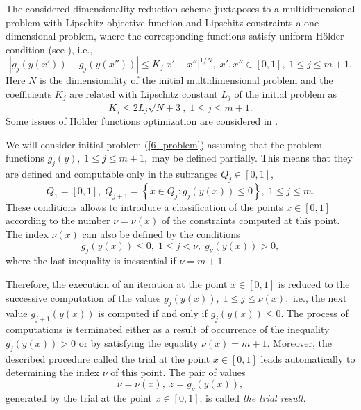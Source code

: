 The considered dimensionality reduction scheme juxtaposes to a multidimensional problem with Lipschitz objective function and Lipschitz constraints a one-dimensional problem, where the corresponding functions satisfy uniform H\"{o}lder condition (see \cite{6_Strongin2000,6_Strongin2013}), i.e.,
\begin{equation}\label{6_Holder}
\left|g_j(y(x'))-g_j(y(x''))\right| \leq K_j \left|x'-x''\right|^{1/N}, \; x',x''\in [0,1], \; 1\leq j \leq m+1. 
\end{equation}
Here $N$ is the dimensionality of the initial multidimensional problem and the coefficients $K_j$ are related with Lipschitz constant $L_j$ of the initial problem as 
\[
K_j \leq 2L_j \sqrt{N+3},\; 1\leq j \leq m+1.
\]
Some issues of H\"older functions optimization are considered in \cite{6_Gourdin,6_Lera2002,6_Lera2010,6_Hime,6_Lera2015}.

We will consider initial problem (\ref{6_problem}) assuming that the problem functions $g_j(y),\; 1 \leq j \leq m+1,$ may be defined partially. This means that they are defined and computable only in the subranges $Q_j \in [0,1]$, 
\begin{equation}\label{6_Q}
Q_1=[0,1], \; Q_{j+1}=\left\{x \in Q_j : g_j(y(x)) \leq 0 \right\}, \; 1 \leq j \leq m.
\end{equation}
These conditions allows to introduce a classification of the points $x \in [0,1]$ according to the number $\nu = \nu(x)$ of the constraints computed at this point. The index $\nu(x)$ can also be defined by the conditions
\begin{equation}\label{6_nu}
g_j(y(x)) \leq 0, \; 1 \leq j < \nu, \; g_\nu(y(x))>0,
\end{equation}
where the last inequality is inessential if $\nu=m+1$.

Therefore, the execution of an iteration at the point $x \in [0,1]$ is reduced to the successive computation of the values $g_j(y(x)),\; 1 \leq j \leq \nu(x),$ i.e., the next value $g_{j+1}(y(x))$ is computed if and only if $g_j(y(x)) \leq 0$. The process of computations is terminated either as a result of occurrence of the inequality $g_j(y(x))>0$ or by satisfying the equality $\nu(x)=m+1$. Moreover, the described procedure called the trial at the point $x \in [0,1]$ leads automatically to determining the index $\nu$ of this point. %
The pair of values 
\[
\nu=\nu(x), \; z=g_\nu(y(x)),
\]
generated by the trial at the point $x \in [0,1]$, is called \textit{the trial result}.

